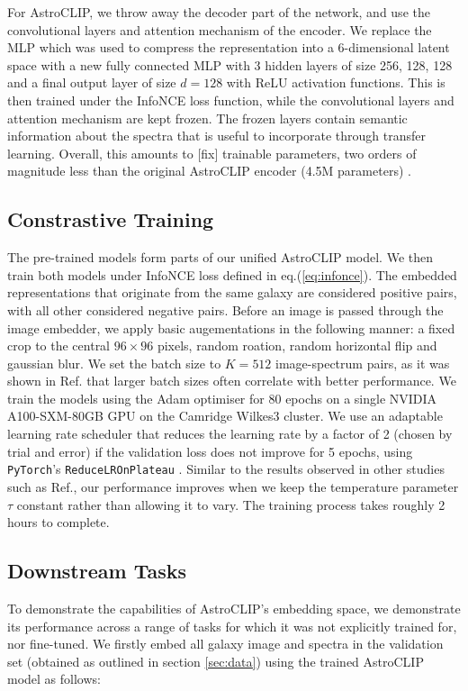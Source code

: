 \documentclass[a4paper,12pt]{article}
\begin{document}
For AstroCLIP, we throw away the decoder part of the network, and use the convolutional layers and attention mechanism of the encoder. We replace the MLP which was used to compress the representation into a 6-dimensional latent space with a new fully connected MLP with 3 hidden layers of size 256, 128, 128 and a final output layer of size $d=128$ with ReLU activation functions. This is then trained under the InfoNCE loss function, while the convolutional layers and attention mechanism are kept frozen. The frozen layers contain semantic information about the spectra that is useful to incorporate through transfer learning. Overall, this amounts to [fix] trainable parameters, two orders of magnitude less than the original AstroCLIP encoder (4.5M parameters) \cite{astroclip}. 


\subsection{Constrastive Training}
The pre-trained models form parts of our unified AstroCLIP model. We then train both models under InfoNCE loss defined in eq.(\ref{eq:infonce}). The embedded representations that originate from the same galaxy are considered positive pairs, with all other considered negative pairs. Before an image is passed through the image embedder, we apply basic augementations in the following manner: a fixed crop to the central $96 \times 96$ pixels, random roation, random horizontal flip and gaussian blur. We set the batch size to $K=512$ image-spectrum pairs, as it was shown in Ref.\cite{radford2021learning} that larger batch sizes often correlate with better performance. We train the models using the Adam optimiser \cite{adam} for 80 epochs on a single NVIDIA A100-SXM-80GB GPU on the Camridge Wilkes3 cluster. We use an adaptable learning rate scheduler that reduces the learning rate by a factor of 2 (chosen by trial and error) if the validation loss does not improve for 5 epochs, using \verb|PyTorch|'s \verb|ReduceLROnPlateau| \cite{LRon}. Similar to the results observed in other studies such as Ref.\cite{gir},  our performance improves when we keep the temperature parameter $\tau$ constant rather than allowing it to vary. The training process takes roughly 2 hours to complete.

\subsection{Downstream Tasks}
To demonstrate the capabilities of AstroCLIP's embedding space, we demonstrate its performance across a range of tasks for which it was not explicitly trained for, nor fine-tuned. We firstly embed all galaxy image and spectra in the validation set (obtained as outlined in section \ref{sec:data}) using the trained AstroCLIP model as follows:
\end{document}
